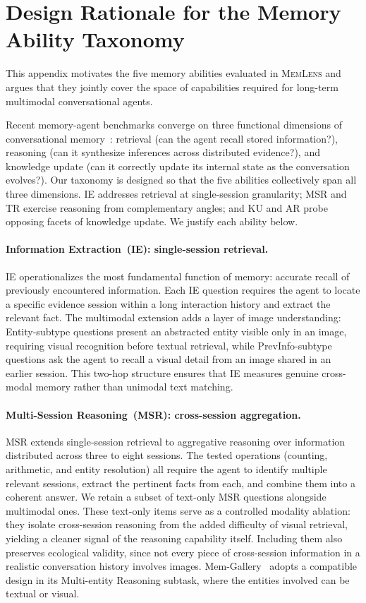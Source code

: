 \documentclass{llmxive}
\providecommand{\bench}{\textsc{MemLens}}
\begin{document}
\section{Design Rationale for the Memory Ability Taxonomy}
\label{app:taxonomy_rationale}

This appendix motivates the five memory abilities evaluated in \bench{} and argues that they jointly cover the space of capabilities required for long-term multimodal conversational agents.

Recent memory-agent benchmarks converge on three functional dimensions of conversational memory~\cite{memgallery,wu2025longmemevalbenchmarkingchatassistants}: retrieval (can the agent recall stored information?), reasoning (can it synthesize inferences across distributed evidence?), and knowledge update (can it correctly update its internal state as the conversation evolves?). Our taxonomy is designed so that the five abilities collectively span all three dimensions. IE addresses retrieval at single-session granularity; MSR and TR exercise reasoning from complementary angles; and KU and AR probe opposing facets of knowledge update. We justify each ability below.

\paragraph{Information Extraction~(IE): single-session retrieval.}
IE operationalizes the most fundamental function of memory: accurate recall of previously encountered information. Each IE question requires the agent to locate a specific evidence session within a long interaction history and extract the relevant fact. The multimodal extension adds a layer of image understanding: Entity-subtype questions present an abstracted entity visible only in an image, requiring visual recognition before textual retrieval, while PrevInfo-subtype questions ask the agent to recall a visual detail from an image shared in an earlier session. This two-hop structure ensures that IE measures genuine cross-modal memory rather than unimodal text matching.

\paragraph{Multi-Session Reasoning~(MSR): cross-session aggregation.}
MSR extends single-session retrieval to aggregative reasoning over information distributed across three to eight sessions. The tested operations (counting, arithmetic, and entity resolution) all require the agent to identify multiple relevant sessions, extract the pertinent facts from each, and combine them into a coherent answer. We retain a subset of text-only MSR questions alongside multimodal ones. These text-only items serve as a controlled modality ablation: they isolate cross-session reasoning from the added difficulty of visual retrieval, yielding a cleaner signal of the reasoning capability itself. Including them also preserves ecological validity, since not every piece of cross-session information in a realistic conversation history involves images. Mem-Gallery~\cite{memgallery} adopts a compatible design in its Multi-entity Reasoning subtask, where the entities involved can be textual or visual.
\end{document}
